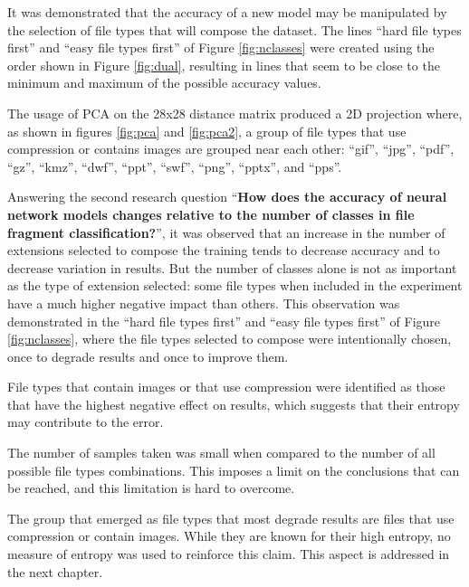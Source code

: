 It was demonstrated that the accuracy of a new model may be manipulated by the selection of file types that will compose the dataset. The lines ``hard file types first'' and ``easy file types first'' of Figure \ref{fig:nclasses} were created using the order shown in Figure \ref{fig:dual}, resulting in lines that seem to be close to the minimum and maximum of the possible accuracy values. 


The usage of PCA on the 28x28 distance matrix produced a 2D projection where, as shown in figures \ref{fig:pca} and \ref{fig:pca2}, a group of file types that use compression or contains images are grouped near each other: 
``gif'',
``jpg'',
``pdf'',
``gz'',
``kmz'',
``dwf'',
``ppt'',
``swf'',
``png'',
``pptx'',
and ``pps''.



Answering the second research question ``\textbf{How does the accuracy of neural network models changes relative to the number of classes in file fragment classification?}'', 
it was observed that an increase in the number of extensions selected to compose the training tends to decrease accuracy and to decrease variation in results. But the number of classes alone is not as important as the type of extension selected: some file types when included in the experiment have a much higher negative impact than others. This observation was demonstrated in the ``hard file types first'' and ``easy file types first'' of Figure \ref{fig:nclasses}, where the file types selected to compose were intentionally chosen, once to degrade results and once to improve them.


File types that contain images or that use compression were identified as those that have the highest negative effect on results, which suggests that their entropy may contribute to the error.

The number of samples taken was small when compared to the number of all possible file types combinations. This imposes a limit on the conclusions that can be reached, and this limitation is hard to overcome.

The group that emerged as file types that most degrade results are files that use compression or contain images. While they are known for their high entropy, no measure of entropy was used to reinforce this claim.
This aspect is addressed in the next chapter.
